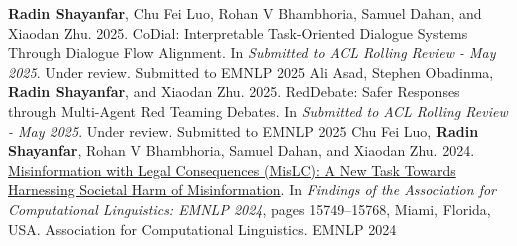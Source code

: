 
\begin{cvhonors}

  \cvpub
    {\textbf{Radin Shayanfar}, Chu Fei Luo, Rohan V Bhambhoria, Samuel Dahan, and Xiaodan Zhu. 2025. CoDial: Interpretable Task-Oriented Dialogue Systems Through Dialogue Flow Alignment. In \textit{Submitted to ACL Rolling Review - May 2025}. Under review.} %
    {Submitted to EMNLP} %
    {2025} %
  \cvpub
    {Ali Asad, Stephen Obadinma, \textbf{Radin Shayanfar}, and Xiaodan Zhu. 2025. RedDebate: Safer Responses through Multi-Agent Red Teaming Debates. In \textit{Submitted to ACL Rolling Review - May 2025}. Under review.} %
    {Submitted to EMNLP} %
    {2025} %
  \cvpub
    {Chu Fei Luo, \textbf{Radin Shayanfar}, Rohan V Bhambhoria, Samuel Dahan, and Xiaodan Zhu. 2024. \href{https://aclanthology.org/2024.findings-emnlp.924/}{Misinformation with Legal Consequences (MisLC): A New Task Towards Harnessing Societal Harm of Misinformation}. In \textit{Findings of the Association for Computational Linguistics: EMNLP 2024}, pages 15749–15768, Miami, Florida, USA. Association for Computational Linguistics.} %
    {EMNLP} %
    {2024} %
\end{cvhonors}






